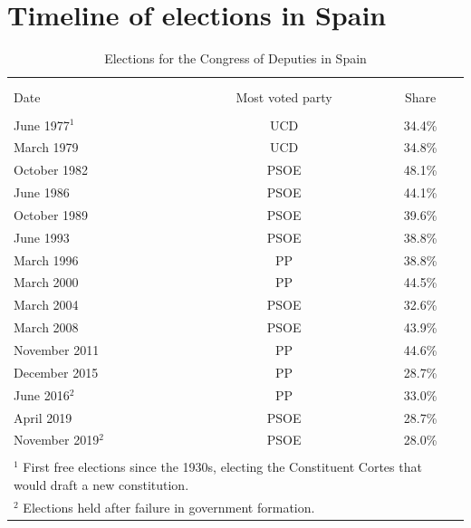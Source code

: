\documentclass[12pt, titlepage]{article}
\begin{document}



\clearpage
\section{Timeline of elections in Spain}\label{app:timeline_elections}

\begin{table}[!htbp] \centering
\caption{Elections for the Congress of Deputies in Spain}
\label{tab:elections}
\small
\begin{tabular}{lcc}
\\[-1.8ex]\hline
\hline \\[-1.8ex]
\\[-1.8ex]
Date & Most voted party & Share \\
\hline \\[-1.8ex]
June 1977$^1$ & UCD & 34.4\% \\
March 1979 & UCD & 34.8\% \\
October 1982 & PSOE & 48.1\% \\
June 1986 & PSOE & 44.1\% \\
October 1989 & PSOE & 39.6\% \\
June 1993 & PSOE & 38.8\% \\
March 1996 & PP & 38.8\% \\
March 2000 & PP & 44.5\% \\
March 2004 & PSOE & 32.6\% \\
March 2008 & PSOE & 43.9\% \\
November 2011 & PP & 44.6\% \\
December 2015 & PP & 28.7\% \\
June 2016$^2$ & PP & 33.0\% \\
April 2019 & PSOE & 28.7\% \\
November 2019$^2$ & PSOE & 28.0\% \\
\hline
\hline \\[-1.8ex]
\multicolumn{3}{p{8.5cm}}{\footnotesize $^1$ First free elections since the 1930s, electing the Constituent Cortes that would draft a new constitution.}\\
\multicolumn{3}{p{8.5cm}}{\footnotesize $^2$ Elections held after failure in government formation.}
\end{tabular}
\end{table}
\end{document}
